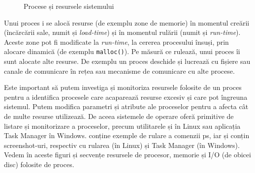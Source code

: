 \begin{figure}[!htbp]
  \centering
  \def\svgwidth{0.8\textwidth}
  
  \caption{Procese și resursele sistemului}
  \label{fig:process:resources}
\end{figure}

Unui proces i se alocă resurse (de exemplu zone de memorie) în momentul creării (încărcării sale, numit și \textit{load-time}) și în momentul rulării (numit și \textit{run-time}).
Aceste zone pot fi modificate la \textit{run-time}, la cererea procesului însuși, prin alocare dinamică (de exemplu \texttt{malloc()}).
Pe măsură ce rulează, unui proces îi sunt alocate alte resurse.
De exemplu un proces deschide și lucrează cu fișiere sau canale de comunicare în rețea sau mecanisme de comunicare cu alte procese.

Este important să putem investiga și monitoriza resursele folosite de un proces pentru a identifica procesele care acaparează resurse excesiv și care pot îngreuna sistemul.
Putem modifica parametri și atribute ale proceselor pentru a afecta cât de multe resurse utilizează.
De aceea sistemele de operare oferă primitive de listare și monitorizare a proceselor, precum utilitarele  și  în Linux sau aplicația Task Manager în Windows.
 conține exemple de rulare a comenzii ps, iar  și  conțin screenshot-uri, respectiv cu rularea  (în Linux) și Task Manager (în Windows).
Vedem în aceste figuri și secvențe resursele de procesor, memorie și I/O (de obicei disc) folosite de proces.


